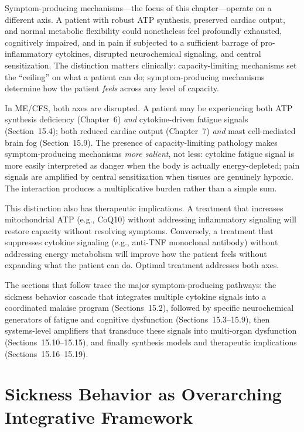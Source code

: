 Symptom-producing mechanisms---the focus of this chapter---operate on a different axis. A patient with robust ATP synthesis, preserved cardiac output, and normal metabolic flexibility could nonetheless feel profoundly exhausted, cognitively impaired, and in pain if subjected to a sufficient barrage of pro-inflammatory cytokines, disrupted neurochemical signaling, and central sensitization. The distinction matters clinically: capacity-limiting mechanisms set the ``ceiling'' on what a patient can do; symptom-producing mechanisms determine how the patient \emph{feels} across any level of capacity.

In ME/CFS, both axes are disrupted. A patient may be experiencing both ATP synthesis deficiency (Chapter~6) \emph{and} cytokine-driven fatigue signals (Section~15.4); both reduced cardiac output (Chapter~7) \emph{and} mast cell-mediated brain fog (Section~15.9). The presence of capacity-limiting pathology makes symptom-producing mechanisms \emph{more salient}, not less: cytokine fatigue signal is more easily interpreted as danger when the body is actually energy-depleted; pain signals are amplified by central sensitization when tissues are genuinely hypoxic. The interaction produces a multiplicative burden rather than a simple sum.

This distinction also has therapeutic implications. A treatment that increases mitochondrial ATP (e.g., CoQ10) without addressing inflammatory signaling will restore capacity without resolving symptoms. Conversely, a treatment that suppresses cytokine signaling (e.g., anti-TNF monoclonal antibody) without addressing energy metabolism will improve how the patient feels without expanding what the patient can do. Optimal treatment addresses both axes.

The sections that follow trace the major symptom-producing pathways: the sickness behavior cascade that integrates multiple cytokine signals into a coordinated malaise program (Sections~15.2), followed by specific neurochemical generators of fatigue and cognitive dysfunction (Sections~15.3--15.9), then systems-level amplifiers that transduce these signals into multi-organ dysfunction (Sections~15.10--15.15), and finally synthesis models and therapeutic implications (Sections~15.16--15.19).


\section{Sickness Behavior as Overarching Integrative Framework}
\label{sec:ch15-sickness-behavior}

